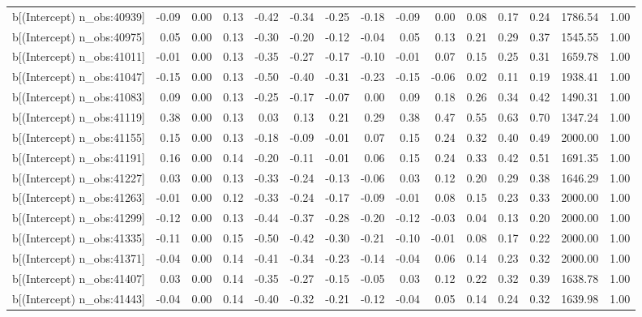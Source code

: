 \begin{table}[ht]
\begin{tabular}{rrrrrrrrrrrrrrr}
  b[(Intercept) n\_obs:40939] & -0.09 & 0.00 & 0.13 & -0.42 & -0.34 & -0.25 & -0.18 & -0.09 & 0.00 & 0.08 & 0.17 & 0.24 & 1786.54 & 1.00 \\ 
  b[(Intercept) n\_obs:40975] & 0.05 & 0.00 & 0.13 & -0.30 & -0.20 & -0.12 & -0.04 & 0.05 & 0.13 & 0.21 & 0.29 & 0.37 & 1545.55 & 1.00 \\ 
  b[(Intercept) n\_obs:41011] & -0.01 & 0.00 & 0.13 & -0.35 & -0.27 & -0.17 & -0.10 & -0.01 & 0.07 & 0.15 & 0.25 & 0.31 & 1659.78 & 1.00 \\ 
  b[(Intercept) n\_obs:41047] & -0.15 & 0.00 & 0.13 & -0.50 & -0.40 & -0.31 & -0.23 & -0.15 & -0.06 & 0.02 & 0.11 & 0.19 & 1938.41 & 1.00 \\ 
  b[(Intercept) n\_obs:41083] & 0.09 & 0.00 & 0.13 & -0.25 & -0.17 & -0.07 & 0.00 & 0.09 & 0.18 & 0.26 & 0.34 & 0.42 & 1490.31 & 1.00 \\ 
  b[(Intercept) n\_obs:41119] & 0.38 & 0.00 & 0.13 & 0.03 & 0.13 & 0.21 & 0.29 & 0.38 & 0.47 & 0.55 & 0.63 & 0.70 & 1347.24 & 1.00 \\ 
  b[(Intercept) n\_obs:41155] & 0.15 & 0.00 & 0.13 & -0.18 & -0.09 & -0.01 & 0.07 & 0.15 & 0.24 & 0.32 & 0.40 & 0.49 & 2000.00 & 1.00 \\ 
  b[(Intercept) n\_obs:41191] & 0.16 & 0.00 & 0.14 & -0.20 & -0.11 & -0.01 & 0.06 & 0.15 & 0.24 & 0.33 & 0.42 & 0.51 & 1691.35 & 1.00 \\ 
  b[(Intercept) n\_obs:41227] & 0.03 & 0.00 & 0.13 & -0.33 & -0.24 & -0.13 & -0.06 & 0.03 & 0.12 & 0.20 & 0.29 & 0.38 & 1646.29 & 1.00 \\ 
  b[(Intercept) n\_obs:41263] & -0.01 & 0.00 & 0.12 & -0.33 & -0.24 & -0.17 & -0.09 & -0.01 & 0.08 & 0.15 & 0.23 & 0.33 & 2000.00 & 1.00 \\ 
  b[(Intercept) n\_obs:41299] & -0.12 & 0.00 & 0.13 & -0.44 & -0.37 & -0.28 & -0.20 & -0.12 & -0.03 & 0.04 & 0.13 & 0.20 & 2000.00 & 1.00 \\ 
  b[(Intercept) n\_obs:41335] & -0.11 & 0.00 & 0.15 & -0.50 & -0.42 & -0.30 & -0.21 & -0.10 & -0.01 & 0.08 & 0.17 & 0.22 & 2000.00 & 1.00 \\ 
  b[(Intercept) n\_obs:41371] & -0.04 & 0.00 & 0.14 & -0.41 & -0.34 & -0.23 & -0.14 & -0.04 & 0.06 & 0.14 & 0.23 & 0.32 & 2000.00 & 1.00 \\ 
  b[(Intercept) n\_obs:41407] & 0.03 & 0.00 & 0.14 & -0.35 & -0.27 & -0.15 & -0.05 & 0.03 & 0.12 & 0.22 & 0.32 & 0.39 & 1638.78 & 1.00 \\ 
  b[(Intercept) n\_obs:41443] & -0.04 & 0.00 & 0.14 & -0.40 & -0.32 & -0.21 & -0.12 & -0.04 & 0.05 & 0.14 & 0.24 & 0.32 & 1639.98 & 1.00 \\ 

\end{tabular}
\end{table}
